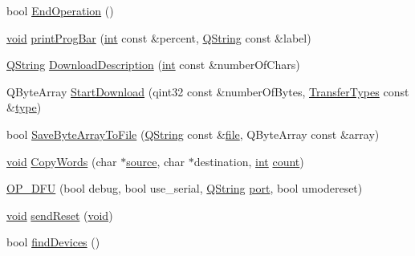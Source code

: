 \begin{DoxyCompactItemize}
\item 
bool \hyperlink{class_o_p___d_f_u_a26d403a9031d352133138eae34d93123}{End\-Operation} ()
\item 
\hyperlink{group___u_a_v_objects_plugin_ga444cf2ff3f0ecbe028adce838d373f5c}{void} \hyperlink{class_o_p___d_f_u_af5460e6e1ed7018154f708a7aa0b5fc5}{print\-Prog\-Bar} (\hyperlink{ioapi_8h_a787fa3cf048117ba7123753c1e74fcd6}{int} const \&percent, \hyperlink{group___u_a_v_objects_plugin_gab9d252f49c333c94a72f97ce3105a32d}{Q\-String} const \&label)
\item 
\hyperlink{group___u_a_v_objects_plugin_gab9d252f49c333c94a72f97ce3105a32d}{Q\-String} \hyperlink{class_o_p___d_f_u_a2c917ead032c030fc4ef722e37706a39}{Download\-Description} (\hyperlink{ioapi_8h_a787fa3cf048117ba7123753c1e74fcd6}{int} const \&number\-Of\-Chars)
\item 
Q\-Byte\-Array \hyperlink{class_o_p___d_f_u_acd2d997452e6be8732f8b681bcd5f3ed}{Start\-Download} (qint32 const \&number\-Of\-Bytes, \hyperlink{class_o_p___d_f_u_a83050451478c761350cd1627e56d4617}{Transfer\-Types} const \&\hyperlink{glext_8h_a7d05960f4f1c1b11f3177dc963a45d86}{type})
\item 
bool \hyperlink{class_o_p___d_f_u_ac8040ec7a1c68807175dbc3ffc79e6a9}{Save\-Byte\-Array\-To\-File} (\hyperlink{group___u_a_v_objects_plugin_gab9d252f49c333c94a72f97ce3105a32d}{Q\-String} const \&\hyperlink{uavobjecttemplate_8m_a97c04efa65bcf0928abf9260bc5cbf46}{file}, Q\-Byte\-Array const \&array)
\item 
\hyperlink{group___u_a_v_objects_plugin_ga444cf2ff3f0ecbe028adce838d373f5c}{void} \hyperlink{class_o_p___d_f_u_a567af9a6f1bdf4cfb443f02e1a683257}{Copy\-Words} (char $\ast$\hyperlink{glext_8h_afdd0f0e67e302eefcb4f6b23732e7ea3}{source}, char $\ast$destination, \hyperlink{ioapi_8h_a787fa3cf048117ba7123753c1e74fcd6}{int} \hyperlink{glext_8h_a5b40aca7a9682963dd00a8f5aef0a901}{count})
\item 
\hyperlink{class_o_p___d_f_u_a34e347e96208bbac2d269067509724f1}{O\-P\-\_\-\-D\-F\-U} (bool debug, bool use\-\_\-serial, \hyperlink{group___u_a_v_objects_plugin_gab9d252f49c333c94a72f97ce3105a32d}{Q\-String} \hyperlink{classport}{port}, bool umodereset)
\item 
\hyperlink{group___u_a_v_objects_plugin_ga444cf2ff3f0ecbe028adce838d373f5c}{void} \hyperlink{class_o_p___d_f_u_a06b2de80485ee34583701c3706fb42ab}{send\-Reset} (\hyperlink{group___u_a_v_objects_plugin_ga444cf2ff3f0ecbe028adce838d373f5c}{void})
\item 
bool \hyperlink{class_o_p___d_f_u_a10e5ba2189d819ec2485d6a9d6134382}{find\-Devices} ()

\end{DoxyCompactItemize}
